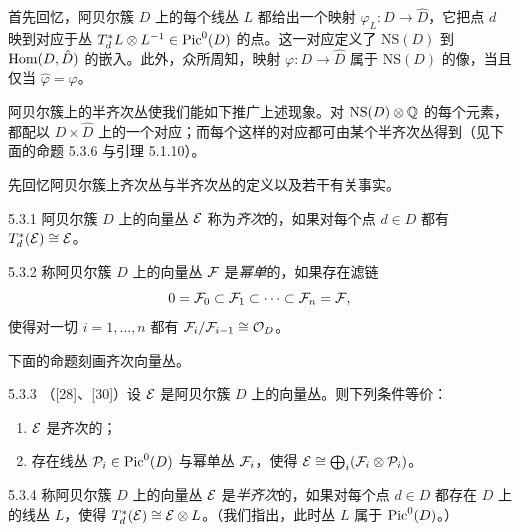 首先回忆，阿贝尔簇 $D$ 上的每个线丛 $L$ 都给出一个映射 $\varphi_L:D\to\hat D$，它把点 $d$ 映到对应于丛 $T_d^*L\otimes L^{-1}\in\operatorname{Pic}^0(D)$ 的点。这一对应定义了 $\mathrm{NS}(D)$ 到 $\operatorname{Hom}(D,\hat D)$ 的嵌入。此外，众所周知，映射 $\varphi:D\to\hat D$ 属于 $\mathrm{NS}(D)$ 的像，当且仅当 $\hat\varphi=\varphi$。


阿贝尔簇上的半齐次丛使我们能如下推广上述现象。对 $\mathrm{NS}(D)\otimes\mathbb{Q}$ 的每个元素，都配以 $D\times\hat D$ 上的一个对应；而每个这样的对应都可由某个半齐次丛得到（见下面的命题 5.3.6 与引理 5.1.10）。

先回忆阿贝尔簇上齐次丛与半齐次丛的定义以及若干有关事实。

\begin{definition}{5.3.1}
阿贝尔簇 $D$ 上的向量丛 $\mathcal{E}$ 称为\emph{齐次}的，如果对每个点 $d\in D$ 都有 $T^*_d(\mathcal{E})\cong\mathcal{E}$。
\end{definition}

\begin{definition}{5.3.2}
称阿贝尔簇 $D$ 上的向量丛 $\mathcal{F}$ 是\emph{幂单}的，如果存在滤链
\begin{equation*}
0=\mathcal{F}_0\subset\mathcal{F}_1\subset\cdots\subset\mathcal{F}_n=\mathcal{F},
\end{equation*}
使得对一切 $i=1,\dots,n$ 都有 $\mathcal{F}_i/\mathcal{F}_{i-1}\cong\mathcal{O}_D$。
\end{definition}

下面的命题刻画齐次向量丛。

\begin{proposition}{5.3.3}
（[28]、[30]）设 $\mathcal{E}$ 是阿贝尔簇 $D$ 上的向量丛。则下列条件等价：
\begin{enumerate}[label=(\roman*),leftmargin=2.8em,itemsep=2pt,topsep=2pt]
\item $\mathcal{E}$ 是齐次的；
\item 存在线丛 $\mathcal{P}_i\in\operatorname{Pic}^0(D)$ 与幂单丛 $\mathcal{F}_i$，使得 $\mathcal{E}\cong\bigoplus_i(\mathcal{F}_i\otimes\mathcal{P}_i)$。
\end{enumerate}
\end{proposition}

\begin{definition}{5.3.4}
称阿贝尔簇 $D$ 上的向量丛 $\mathcal{E}$ 是\emph{半齐次}的，如果对每个点 $d\in D$ 都存在 $D$ 上的线丛 $L$，使得 $T^*_d(\mathcal{E})\cong\mathcal{E}\otimes L$。（我们指出，此时丛 $L$ 属于 $\operatorname{Pic}^0(D)$。）
\end{definition}

